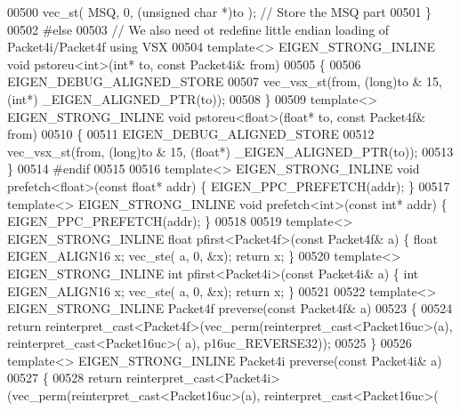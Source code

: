 \begin{DoxyCode}
{00500   vec\_st( MSQ, 0, (\textcolor{keywordtype}{unsigned} \textcolor{keywordtype}{char} *)to );                    \textcolor{comment}{// Store the MSQ part}
00501 \}
00502 \textcolor{preprocessor}{#else}
00503 \textcolor{comment}{// We also need ot redefine little endian loading of Packet4i/Packet4f using VSX}
00504 \textcolor{keyword}{template}<> EIGEN\_STRONG\_INLINE \textcolor{keywordtype}{void} pstoreu<int>(\textcolor{keywordtype}{int}*       to, \textcolor{keyword}{const} Packet4i& from)
00505 \{
00506   EIGEN\_DEBUG\_ALIGNED\_STORE
00507   vec\_vsx\_st(from, (\textcolor{keywordtype}{long})to & 15, (\textcolor{keywordtype}{int}*) \_EIGEN\_ALIGNED\_PTR(to));
00508 \}
00509 \textcolor{keyword}{template}<> EIGEN\_STRONG\_INLINE \textcolor{keywordtype}{void} pstoreu<float>(\textcolor{keywordtype}{float}*   to, \textcolor{keyword}{const} Packet4f& from)
00510 \{
00511   EIGEN\_DEBUG\_ALIGNED\_STORE
00512   vec\_vsx\_st(from, (\textcolor{keywordtype}{long})to & 15, (\textcolor{keywordtype}{float}*) \_EIGEN\_ALIGNED\_PTR(to));
00513 \}
00514 \textcolor{preprocessor}{#endif}
00515 
00516 \textcolor{keyword}{template}<> EIGEN\_STRONG\_INLINE \textcolor{keywordtype}{void} prefetch<float>(\textcolor{keyword}{const} \textcolor{keywordtype}{float}* addr)    \{ EIGEN\_PPC\_PREFETCH(addr); \}
00517 \textcolor{keyword}{template}<> EIGEN\_STRONG\_INLINE \textcolor{keywordtype}{void} prefetch<int>(\textcolor{keyword}{const} \textcolor{keywordtype}{int}*     addr)    \{ EIGEN\_PPC\_PREFETCH(addr); \}
00518 
00519 \textcolor{keyword}{template}<> EIGEN\_STRONG\_INLINE \textcolor{keywordtype}{float}  pfirst<Packet4f>(\textcolor{keyword}{const} Packet4f& a) \{ \textcolor{keywordtype}{float} EIGEN\_ALIGN16 x; vec\_ste(
      a, 0, &x); \textcolor{keywordflow}{return} x; \}
00520 \textcolor{keyword}{template}<> EIGEN\_STRONG\_INLINE \textcolor{keywordtype}{int}    pfirst<Packet4i>(\textcolor{keyword}{const} Packet4i& a) \{ \textcolor{keywordtype}{int}   EIGEN\_ALIGN16 x; vec\_ste(
      a, 0, &x); \textcolor{keywordflow}{return} x; \}
00521 
00522 \textcolor{keyword}{template}<> EIGEN\_STRONG\_INLINE Packet4f preverse(\textcolor{keyword}{const} Packet4f& a)
00523 \{
00524   \textcolor{keywordflow}{return} \textcolor{keyword}{reinterpret\_cast<}Packet4f\textcolor{keyword}{>}(vec\_perm(reinterpret\_cast<Packet16uc>(a), reinterpret\_cast<Packet16uc>(
      a), p16uc\_REVERSE32));
00525 \}
00526 \textcolor{keyword}{template}<> EIGEN\_STRONG\_INLINE Packet4i preverse(\textcolor{keyword}{const} Packet4i& a)
00527 \{
00528   \textcolor{keywordflow}{return} \textcolor{keyword}{reinterpret\_cast<}Packet4i\textcolor{keyword}{>}(vec\_perm(reinterpret\_cast<Packet16uc>(a), reinterpret\_cast<Packet16uc>(
}
\end{DoxyCode}
